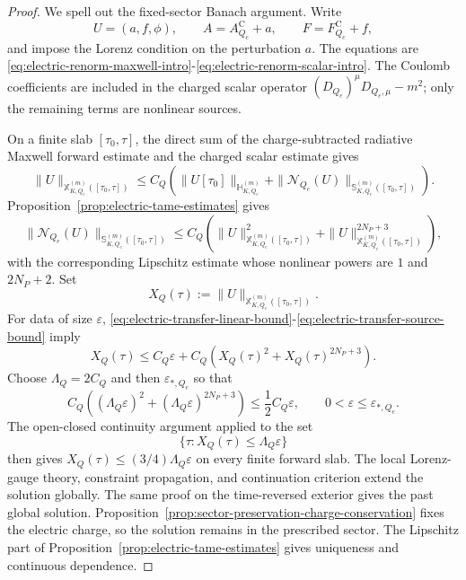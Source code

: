 \documentclass[11pt]{article}
\numberwithin{equation}{section}
\theoremstyle{plain}
\theoremstyle{definition}
\theoremstyle{remark}
\begin{document}
\begin{proof}
We spell out the fixed-sector Banach argument.  Write
\begin{equation}
 U=(a,f,\phi),\qquad A=A^{\mathrm C}_{Q_e}+a,
 \qquad F=F^{\mathrm C}_{Q_e}+f,
\end{equation}
and impose the Lorenz condition on the perturbation \(a\).  The equations are \eqref{eq:electric-renorm-maxwell-intro}-\eqref{eq:electric-renorm-scalar-intro}.  The Coulomb coefficients are included in the charged scalar operator \((D_{Q_e})^\mu D_{Q_e,\mu}-m^2\); only the remaining terms are nonlinear sources.

On a finite slab \([\tau_0,\tau]\), the direct sum of the charge-subtracted radiative Maxwell forward estimate and the charged scalar estimate gives
\begin{equation}\label{eq:electric-transfer-linear-bound}
 \|U\|_{\mathbb X^{(m)}_{K,Q_e}([\tau_0,\tau])}
 \le C_Q\left(\|U[\tau_0]\|_{\mathbb H^{(m)}_{K,Q_e}}+
 \|\mathcal N_{Q_e}(U)\|_{\mathbb S^{(m)}_{K,Q_e}([\tau_0,\tau])}\right).
\end{equation}
Proposition~\ref{prop:electric-tame-estimates} gives
\begin{equation}\label{eq:electric-transfer-source-bound}
 \|\mathcal N_{Q_e}(U)\|_{\mathbb S^{(m)}_{K,Q_e}([\tau_0,\tau])}
 \le C_Q\left(\|U\|_{\mathbb X^{(m)}_{K,Q_e}([\tau_0,\tau])}^2+
 \|U\|_{\mathbb X^{(m)}_{K,Q_e}([\tau_0,\tau])}^{2N_P+3}\right),
\end{equation}
with the corresponding Lipschitz estimate whose nonlinear powers are \(1\) and \(2N_P+2\).  Set
\begin{equation}
 X_Q(\tau):=\|U\|_{\mathbb X^{(m)}_{K,Q_e}([\tau_0,\tau])}.
\end{equation}
For data of size \(\varepsilon\), \eqref{eq:electric-transfer-linear-bound}-\eqref{eq:electric-transfer-source-bound} imply
\begin{equation}\label{eq:electric-transfer-bootstrap}
 X_Q(\tau)\le C_Q\varepsilon+C_Q\left(X_Q(\tau)^2+X_Q(\tau)^{2N_P+3}\right).
\end{equation}
Choose \(\Lambda_Q=2C_Q\) and then \(\varepsilon_{*,Q_e}\) so that
\begin{equation}
 C_Q\left((\Lambda_Q\varepsilon)^2+(\Lambda_Q\varepsilon)^{2N_P+3}\right)
 \le \frac12 C_Q\varepsilon,
 \qquad 0<\varepsilon\le\varepsilon_{*,Q_e}.
\end{equation}
The open-closed continuity argument applied to the set
\begin{equation}
 \{\tau:X_Q(\tau)\le\Lambda_Q\varepsilon\}
\end{equation}
then gives \(X_Q(\tau)\le(3/4)\Lambda_Q\varepsilon\) on every finite forward slab.  The local Lorenz-gauge theory, constraint propagation, and continuation criterion extend the solution globally.  The same proof on the time-reversed exterior gives the past global solution.  Proposition~\ref{prop:sector-preservation-charge-conservation} fixes the electric charge, so the solution remains in the prescribed sector.  The Lipschitz part of Proposition~\ref{prop:electric-tame-estimates} gives uniqueness and continuous dependence.


\end{proof}
\end{document}
